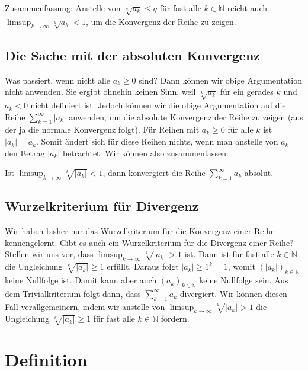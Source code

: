 \documentclass[fontsize=9pt,
               parskip=half-,
               DIV=14,
               listof=chapterentry,
               tocflat]{scrbook}
\begin{document}
Zusammenfassung: Anstelle von ${\sqrt[{k}]{a_{k}}}\leq q$ für fast alle $k\in \mathbb {N} $ reicht auch $\limsup _{k\to \infty }{\sqrt[{k}]{a_{k}}}<1$, um die Konvergenz der Reihe zu zeigen.

\subsection{Die Sache mit der absoluten Konvergenz}

Was passiert, wenn nicht alle $a_{k}\geq 0$ sind? Dann können wir obige Argumentation nicht anwenden. Sie ergibt ohnehin keinen Sinn, weil ${\sqrt[{k}]{a_{k}}}$ für ein gerades $k$ und $a_{k}<0$ nicht definiert ist. Jedoch können wir die obige Argumentation auf die Reihe $\sum _{k=1}^{\infty }|a_{k}|$ anwenden, um die absolute Konvergenz der Reihe zu zeigen (aus der ja die normale Konvergenz folgt). Für Reihen mit $a_{k}\geq 0$ für alle $k$ ist $|a_{k}|=a_{k}$. Somit ändert sich für diese Reihen nichts, wenn man anstelle von $a_{k}$ den Betrag $|a_{k}|$ betrachtet. Wir können also zusammenfassen:

\begin{importantparagraph*}
Ist $\limsup _{k\to \infty }{\sqrt[{k}]{|a_{k}|}}<1$, dann konvergiert die Reihe $\sum _{k=1}^{\infty }a_{k}$ absolut.

\end{importantparagraph*}

\subsection{Wurzelkriterium für Divergenz}

Wir haben bisher nur das Wurzelkriterium für die Konvergenz einer Reihe kennengelernt. Gibt es auch ein Wurzelkriterium für die Divergenz einer Reihe? Stellen wir uns vor, dass $\limsup _{k\to \infty }{\sqrt[{k}]{|a_{k}|}}>1$ ist. Dann ist für fast alle $k\in \mathbb {N} $ die Ungleichung ${\sqrt[{k}]{|a_{k}|}}\geq 1$ erfüllt. Daraus folgt $|a_{k}|\geq 1^{k}=1$, womit $\left(|a_{k}|\right)_{k\in \mathbb {N} }$ keine Nullfolge ist. Damit kann aber auch $\left(a_{k}\right)_{k\in \mathbb {N} }$ keine Nullfolge sein. Aus dem Trivialkriterium folgt dann, dass $\sum _{k=1}^{\infty }a_{k}$ divergiert. Wir können diesen Fall verallgemeinern, indem wir anstelle von $\limsup _{k\to \infty }{\sqrt[{k}]{|a_{k}|}}>1$ die Ungleichung ${\sqrt[{k}]{|a_{k}|}}\geq 1$ für fast alle $k\in \mathbb {N} $ fordern.

\section{Definition}
\end{document}
